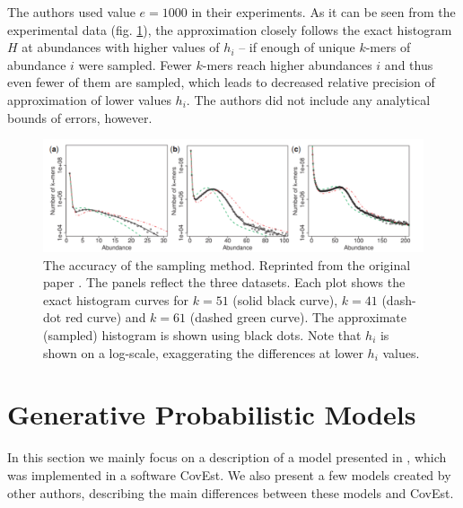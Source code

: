 The authors used value $e=1000$ in their experiments. As it can be seen from the experimental data (fig. \ref{img:kmergenie-sampling-accuracy}),
the approximation closely follows the exact histogram $H$ at abundances with higher values of $h_i$ -- if enough of unique $k$-mers of abundance 
$i$ were sampled. Fewer $k$-mers reach higher abundances $i$ and thus even fewer of them are sampled, which leads  
to decreased relative precision of approximation of lower values $h_i$. The authors did not include any analytical bounds of errors, however.

\begin{figure}
\centerline{\includegraphics[width=1.1\textwidth]{images/kmergenie-sampling-accuracy.pdf}}
\caption[Accuracy of KmerGenie Sampling]{The accuracy of the sampling method. Reprinted from the original paper \cite{Chikhi2013}. 
The panels reflect the three datasets. Each plot shows the exact
histogram curves for $k=51$ (solid black curve), $k=41$ (dash-dot red curve) and $k=61$ (dashed green curve). The approximate (sampled) histogram is
shown using black dots. Note that $h_i$ is shown on a log-scale, exaggerating the differences at lower $h_i$ values.}
\label{img:kmergenie-sampling-accuracy}
\end{figure}


\section{Generative Probabilistic Models}

In this section we mainly focus on a description of a model presented in \cite{Hozza2015, Hozza2016},
which was implemented in a software CovEst. We also present a few models created by other authors,
describing the main differences between these models and CovEst.
